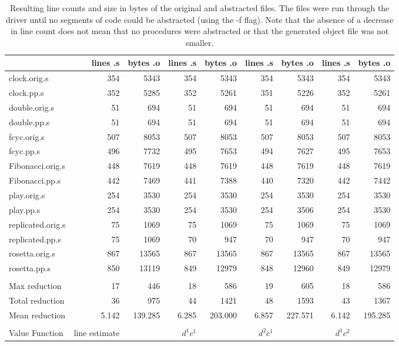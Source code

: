 \documentclass[9pt,nocopyrightspace]{sigplanconf}
\begin{document}
\begin{table}
\begin{center}
\begin{tabular}{|l|r|r|r|r|r|r|r|r|} \hline
&lines .s&bytes .o&lines .s&bytes .o&lines .s&bytes .o&lines .s&bytes .o\\ \hline
clock.orig.s&354&5343&354&5343&354&5343&354&5343\\ \hline
clock.pp.s&352&5285&352&5261&351&5226&352&5261\\ \hline
double.orig.s&51&694&51&694&51&694&51&694\\ \hline
double.pp.s&51&694&51&694&51&694&51&694\\ \hline
fcyc.orig.s&507&8053&507&8053&507&8053&507&8053\\ \hline
fcyc.pp.s&496&7732&495&7653&494&7627&495&7653\\ \hline
Fibonacci.orig.s&448&7619&448&7619&448&7619&448&7619\\ \hline
Fibonacci.pp.s&442&7469&441&7388&440&7320&442&7442\\ \hline
play.orig.s&254&3530&254&3530&254&3530&254&3530\\ \hline
play.pp.s&254&3530&254&3530&254&3506&254&3530\\ \hline
replicated.orig.s&75&1069&75&1069&75&1069&75&1069\\ \hline
replicated.pp.s&75&1069&70&947&70&947&70&947\\ \hline
rosetta.orig.s&867&13565&867&13565&867&13565&867&13565\\ \hline
rosetta.pp.s&850&13119&849&12979&848&12960&849&12979\\ \hline
&&&&&&&&\\ \hline
Max reduction&17&446&18&586&19&605&18&586\\ \hline
Total reduction&36&975&44&1421&48&1593&43&1367\\ \hline
Mean reduction&5.142&139.285&6.285&203.000&6.857&227.571&6.142&195.285\\ \hline
&&&&&&&&\\ \hline
Value Function&line estimate&&$d^{1} c^{1}$&&$d^{2} c^{1}$&&$d^{1} c^{2}$&\\ \hline
\end{tabular}
\caption{Resulting line counts and size in bytes of the original and abstracted files. The files were run through the driver until no segments of code could be abstracted (using the -f flag). Note that the absence of a decrease in line count does not mean that no procedures were abstracted or that the generated object file was not smaller.}
\end{center}
\end{table}
\end{document}
